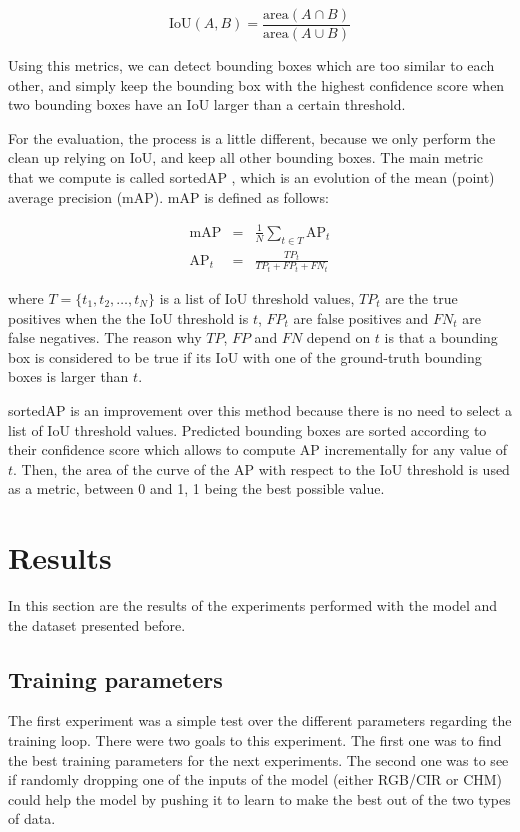 \documentclass[
]{report}
\begin{document}
\[
\text{IoU}(A, B) = \frac{\text{area}(A \cap B)}{\text{area}(A \cup B)}
\]

Using this metrics, we can detect bounding boxes which are too similar
to each other, and simply keep the bounding box with the highest
confidence score when two bounding boxes have an IoU larger than a
certain threshold.

For the evaluation, the process is a little different, because we only
perform the clean up relying on IoU, and keep all other bounding boxes.
The main metric that we compute is called sortedAP \autocite{sortedAP},
which is an evolution of the mean (point) average precision (mAP). mAP
is defined as follows:

\[
\begin{array}{rcl}
\text{mAP} & = & \frac{1}{N} \sum\limits_{t\in T} \text{AP}_t \\
\text{AP}_t & = & \frac{{TP}_t}{{TP}_t + {FP}_t + {FN}_t}
\end{array}
\]

where \(T=\{t_1, t_2, \dots, t_N\}\) is a list of IoU threshold values,
\({TP}_t\) are the true positives when the the IoU threshold is \(t\),
\({FP}_t\) are false positives and \({FN}_t\) are false negatives. The
reason why \(TP\), \(FP\) and \(FN\) depend on \(t\) is that a bounding
box is considered to be true if its IoU with one of the ground-truth
bounding boxes is larger than \(t\).

sortedAP is an improvement over this method because there is no need to
select a list of IoU threshold values. Predicted bounding boxes are
sorted according to their confidence score which allows to compute
\(\text{AP}\) incrementally for any value of \(t\). Then, the area of
the curve of the AP with respect to the IoU threshold is used as a
metric, between 0 and 1, 1 being the best possible value.

\chapter{Results}\label{results}

In this section are the results of the experiments performed with the
model and the dataset presented before.

\section{Training parameters}\label{training-parameters}

The first experiment was a simple test over the different parameters
regarding the training loop. There were two goals to this experiment.
The first one was to find the best training parameters for the next
experiments. The second one was to see if randomly dropping one of the
inputs of the model (either RGB/CIR or CHM) could help the model by
pushing it to learn to make the best out of the two types of data.
\end{document}
